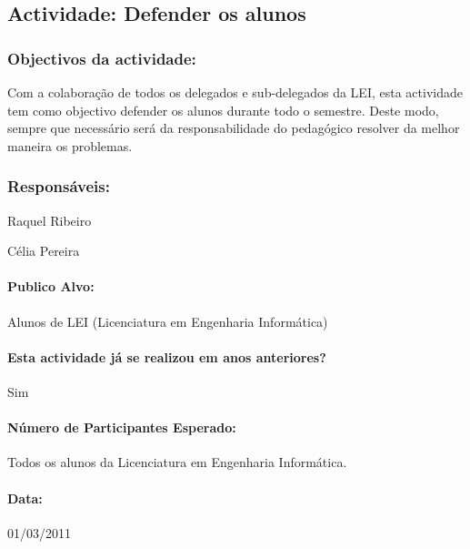 \subsection{Actividade: Defender os alunos} %

\subsubsection*{Objectivos da actividade:}

Com a colaboração de todos os delegados e sub-delegados da LEI, esta actividade tem como objectivo defender os alunos durante todo o semestre. Deste modo, sempre que necessário será da responsabilidade do pedagógico resolver da melhor maneira os problemas.

\subsubsection*{Responsáveis:}
\begin{itemizedash}
	\item{Raquel Ribeiro}
	\item{Célia Pereira}
\end{itemizedash}

\paragraph{Publico Alvo: }
Alunos de LEI (Licenciatura em Engenharia Informática)

\paragraph{Esta actividade já se realizou em anos anteriores?}
Sim

\paragraph{Número de Participantes Esperado:}
Todos os alunos da Licenciatura em Engenharia Informática.

\paragraph{Data:} 01/03/2011


